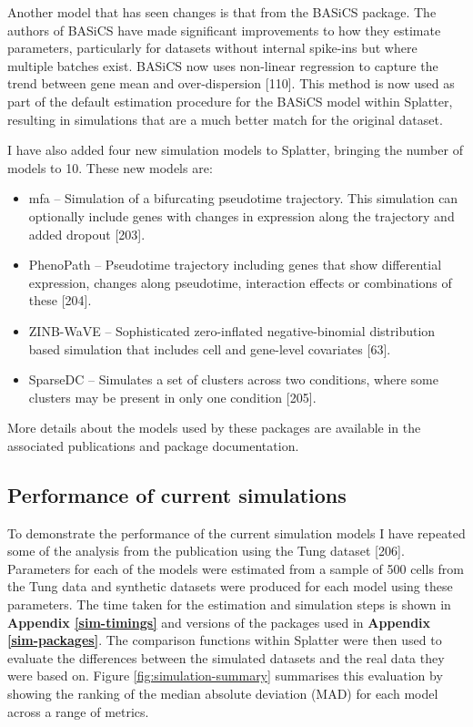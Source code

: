 \documentclass[11pt,a4paper,titlepage,twoside,openright]{style/unimelbthesis}
\theoremstyle{definition}
\theoremstyle{definition}
\theoremstyle{definition}
\theoremstyle{remark}
\begin{document}
\begin{mainmatter}
Another model that has seen changes is that from the BASiCS package. The authors of BASiCS have made significant improvements to how they estimate parameters, particularly for datasets without internal spike-ins but where multiple batches exist. BASiCS now uses non-linear regression to capture the trend between gene mean and over-dispersion {[}110{]}. This method is now used as part of the default estimation procedure for the BASiCS model within Splatter, resulting in simulations that are a much better match for the original dataset.

I have also added four new simulation models to Splatter, bringing the number of models to 10. These new models are:

\begin{itemize}
\tightlist
\item
  mfa -- Simulation of a bifurcating pseudotime trajectory. This simulation can optionally include genes with changes in expression along the trajectory and added dropout {[}203{]}.
\item
  PhenoPath -- Pseudotime trajectory including genes that show differential expression, changes along pseudotime, interaction effects or combinations of these {[}204{]}.
\item
  ZINB-WaVE -- Sophisticated zero-inflated negative-binomial distribution based simulation that includes cell and gene-level covariates {[}63{]}.
\item
  SparseDC -- Simulates a set of clusters across two conditions, where some clusters may be present in only one condition {[}205{]}.
\end{itemize}

More details about the models used by these packages are available in the associated publications and package documentation.

\hypertarget{performance-of-current-simulations}{%
\subsection{Performance of current simulations}\label{performance-of-current-simulations}}

\FloatBarrier

To demonstrate the performance of the current simulation models I have repeated some of the analysis from the publication using the Tung dataset {[}206{]}. Parameters for each of the models were estimated from a sample of 500 cells from the Tung data and synthetic datasets were produced for each model using these parameters. The time taken for the estimation and simulation steps is shown in \textbf{Appendix \ref{sim-timings}} and versions of the packages used in \textbf{Appendix \ref{sim-packages}}. The comparison functions within Splatter were then used to evaluate the differences between the simulated datasets and the real data they were based on. Figure \ref{fig:simulation-summary} summarises this evaluation by showing the ranking of the median absolute deviation (MAD) for each model across a range of metrics.


\end{mainmatter}
\end{document}
